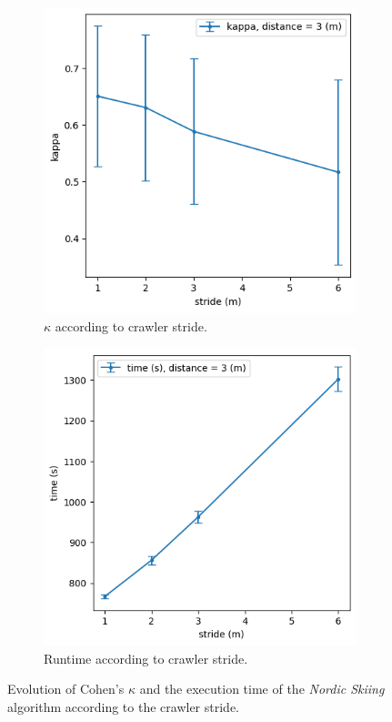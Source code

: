 \documentclass[english,RandD]{rapportPFE}  %
\begin{document}
			\begin{figure}[h!]
				\begin{subfigure}[t]{0.49\linewidth}
					\includegraphics[width=\linewidth]{graphics/ski_nordique-kappa_vs_stride.png}
					\caption{$\kappa$ according to crawler stride.}
					\label{fig:ski_nordique-kappa_vs_stride}
				\end{subfigure}
				\hfill
				\begin{subfigure}[t]{0.49\linewidth}
					\includegraphics[width=\linewidth]{graphics/ski_nordique-time_vs_stride.png}
					\caption{Runtime according to crawler stride.}
					\label{fig:ski_nordique-time_vs_stride}
				\end{subfigure}
				\caption{Evolution of Cohen's $\kappa$ and the execution time of the \textit{Nordic Skiing} algorithm according to the crawler stride.}
				\label{fig:ski_nordique-stride}
			\end{figure}
\end{document}
